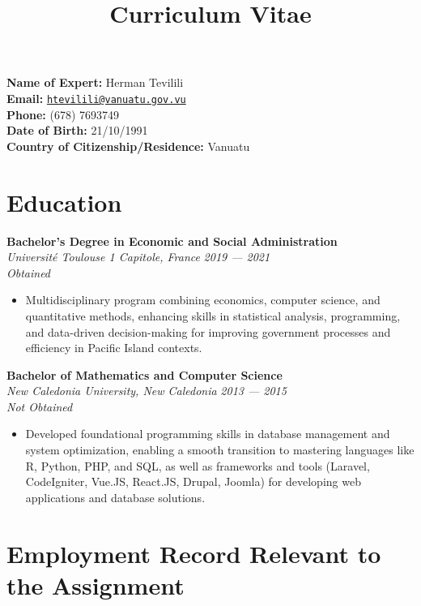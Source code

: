 \documentclass[
  letterpaper,
  DIV=11,
  numbers=noendperiod]{scrartcl}
\title{Curriculum Vitae}
\author{}
\date{}
\providecommand{\tightlist}{%
  \setlength{\itemsep}{0pt}\setlength{\parskip}{0pt}}
\begin{document}
\maketitle


\textbf{Name of Expert:} Herman Tevilili\\
\textbf{Email:}
\href{mailto:htevilili@vanuatu.gov.vu}{\nolinkurl{htevilili@vanuatu.gov.vu}}\\
\textbf{Phone:} (678) 7693749\\
\textbf{Date of Birth:} 21/10/1991\\
\textbf{Country of Citizenship/Residence:} Vanuatu

\section{Education}\label{education}

\textbf{Bachelor's Degree in Economic and Social Administration}\\
\emph{Université Toulouse 1 Capitole, France} {\emph{2019 --- 2021}}\\
\emph{Obtained}

\begin{itemize}
\tightlist
\item
  Multidisciplinary program combining economics, computer science, and
  quantitative methods, enhancing skills in statistical analysis,
  programming, and data-driven decision-making for improving government
  processes and efficiency in Pacific Island contexts.
\end{itemize}

\textbf{Bachelor of Mathematics and Computer Science}\\
\emph{New Caledonia University, New Caledonia} {\emph{2013 --- 2015}}\\
\emph{Not Obtained}

\begin{itemize}
\tightlist
\item
  Developed foundational programming skills in database management and
  system optimization, enabling a smooth transition to mastering
  languages like R, Python, PHP, and SQL, as well as frameworks and
  tools (Laravel, CodeIgniter, Vue.JS, React.JS, Drupal, Joomla) for
  developing web applications and database solutions.
\end{itemize}

\section{Employment Record Relevant to the
Assignment}\label{employment-record-relevant-to-the-assignment}
\end{document}
